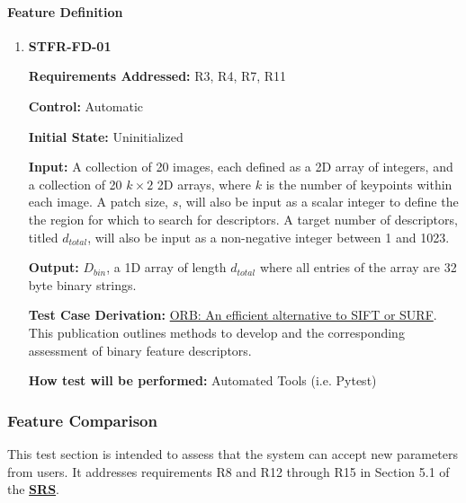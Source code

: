 \documentclass[12pt, titlepage]{article}
\begin{document}
\paragraph{Feature Definition}
\begin{enumerate}
\item \hypertarget{STFR-FD-01}{\textbf{STFR-FD-01}\\}
\textbf{Requirements Addressed:} R3, R4, R7, R11

\textbf{Control:} Automatic

\textbf{Initial State:} Uninitialized

\textbf{Input:} A collection of 20 images, each defined as a 2D array of integers, and a collection of 20 
$k\times 2$ 2D arrays, where $k$ is the number of keypoints within each image. A patch size, $s$, 
will also be input as a scalar integer to define the the region for which to search for descriptors. A target 
number of descriptors, titled $d_{total}$, will also be input as a non-negative integer between 1 and 1023.

\textbf{Output:} $D_{bin}$, a 1D array of length $d_{total}$ where all entries of the array are 32 byte binary strings. 

\textbf{Test Case Derivation:} \href{https://sites.cc.gatech.edu/classes/AY2024/cs4475_summer/images/ORB_an_efficient_alternative_to_SIFT_or_SURF.pdf}
{ORB: An efficient alternative to SIFT or SURF}. This publication outlines methods 
to develop and the corresponding assessment of binary feature descriptors.

\textbf{How test will be performed:} Automated Tools (i.e. Pytest)
\end{enumerate}

\subsubsection{Feature Comparison}

This test section is intended to assess that the system can accept new parameters from users. It addresses 
requirements R8 and R12 through R15 in Section 5.1 of the 
\textbf{\href{https://github.com/KiranSingh15/CAS-741-Image-Correspondences/blob/main/docs/SRS/SRS.pdf}
{SRS}}. 
		
\end{document}
